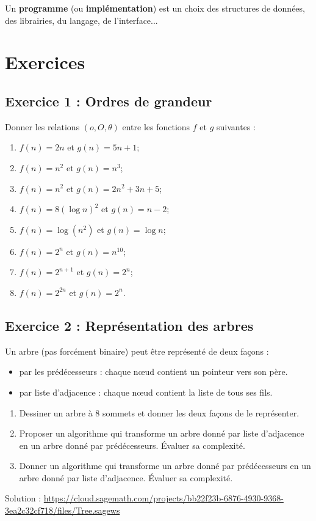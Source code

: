 Un \textbf{programme} (ou \textbf{implémentation}) est un choix des structures de données, des librairies, du langage, de l'interface...


\section*{Exercices}

\subsection*{Exercice 1 : Ordres de grandeur}

Donner les relations $(o, O, \theta)$ entre les fonctions $f$ et $g$ suivantes :

\begin{enumerate}

\item $f(n) = 2n$ et $g(n) = 5n+1$;
\item $f(n) = n^{2}$ et $g(n) = n^{3}$;
\item $f(n) = n^{2}$ et $g(n) = 2n^{2}+3n+5$;
\item $f(n) = 8(\log n)^{2} $ et $g(n) = n - 2$;
\item $f(n) = \log (n^{2})$ et $g(n) = \log n$;
\item $f(n) = 2^{n}$ et $g(n) = n^{10}$;
\item $f(n) = 2^{n+1}$ et $g(n) = 2^{n}$;
\item $f(n) = 2^{2n}$ et $g(n) = 2^{n}$.

\end{enumerate}

\subsection*{Exercice 2 : Représentation des arbres}
Un arbre (pas forcément binaire) peut être représenté de deux façons :
\begin{itemize}[leftmargin=2cm]
\item par les prédécesseurs : chaque nœud contient un pointeur vers son père.
\item par liste d'adjacence : chaque nœud contient la liste de tous ses fils.
\end{itemize}

\begin{enumerate}
\item Dessiner un arbre à 8 sommets et donner les deux façons de le représenter.
\item Proposer un algorithme qui transforme un arbre donné par liste d'adjacence en un arbre donné par prédécesseurs.
Évaluer sa complexité.
\item Donner un algorithme qui transforme un arbre donné par prédécesseurs en un arbre donné par liste d'adjacence.
Évaluer sa complexité.
\end{enumerate}

\vspace{0.2cm}

Solution : \url{https://cloud.sagemath.com/projects/bb22f23b-6876-4930-9368-3ea2c32cf718/files/Tree.sagews}
